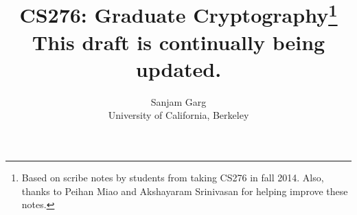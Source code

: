 \documentclass[11pt]{book}
\title{CS276: Graduate Cryptography\thanks{Based on scribe notes by students from taking CS276 in fall 2014. Also, thanks to Peihan Miao and Akshayaram Srinivasan for helping improve these notes.}\\ \textbf{This draft is continually being updated.}}
\author{Sanjam Garg\\ University of California, Berkeley}
\begin{document}
\maketitle

\tableofcontents





\newcommand{\gen}{\mathsf{Gen}}
\newcommand{\enc}{\mathsf{Enc}}
\newcommand{\dec}{\mathsf{Dec}}
\newcommand{\pk}{\mathsf{pk}}
\newcommand{\sk}{\mathsf{sk}}
\newcommand{\fake}{\mathsf{FAKE}}
\newcommand{\mright}[3]{
    $#1$ & \quad$\xrightarrow{\parbox{3cm}{\centering$#2$}}$\quad & $#3$ \\
}
\newcommand{\mleft}[3]{
    $#1$ & \quad$\xleftarrow{\parbox{3cm}{\centering$#2$}}$\quad & $#3$ \\
}





  






%




%
%








%







\iffalse


\end{document}

